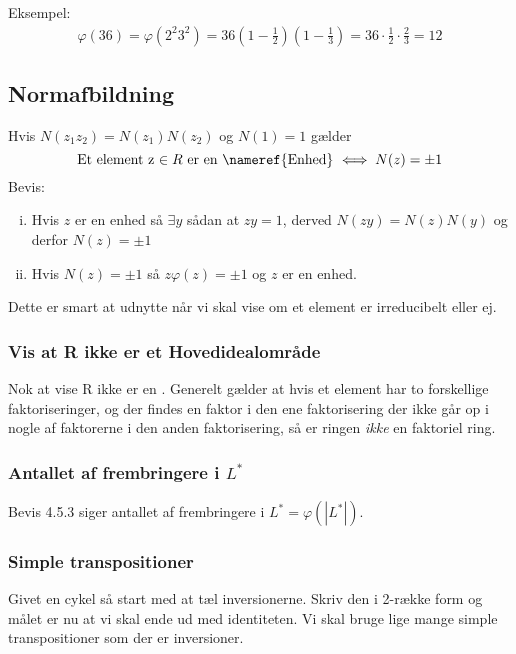 Eksempel:
\begin{align*}
  \varphi(36)=\varphi\left(2^2
3^2\right)=36\left(1-\frac{1}{2}\right)\left(1-\frac{1}{3}\right)=36\cdot\frac{1}{2}\cdot\frac{2}{3}=12
\end{align*}

\subsection{Normafbildning}
Hvis $N(z_1 z_2) = N(z_1)N(z_2)$ og $N(1) = 1$ gælder
\begin{equation*}
  \text{Et element z $\in R$ er en \nameref{Enhed} $\iff N(z) = \pm 1$}
\end{equation*}
Bevis:
\begin{enumerate}[(i)]
  \item Hvis $z$ er en enhed så $\exists y$ sådan at $zy = 1$, derved $N(zy) =
  N(z)N(y)$ og derfor $N(z) = \pm 1$
  \item Hvis $N(z) = \pm 1$ så $z\varphi(z) = \pm 1$ og $z$ er en enhed.
\end{enumerate}
Dette er smart at udnytte når vi skal vise om et element er irreducibelt eller
ej.

\subsubsection{Vis at R ikke er et Hovedidealområde}
Nok at vise R ikke er en .
Generelt gælder at hvis et element har to forskellige faktoriseringer, og der
findes en faktor i den ene faktorisering der ikke går op i nogle af faktorerne
i den anden faktorisering, så er ringen \textit{ikke} en faktoriel ring.

\subsubsection{Antallet af frembringere i $L^*$}
Bevis 4.5.3 siger antallet af frembringere i $L^* = \varphi(|L^*|)$.

\subsubsection{Simple transpositioner}
Givet en cykel så start med at tæl inversionerne. Skriv den i 2-række form og
målet er nu at vi skal ende ud med identiteten. Vi skal bruge lige mange simple
transpositioner som der er inversioner.